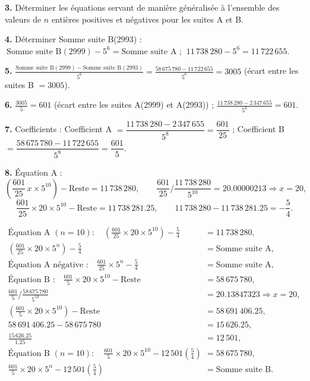 \documentclass[11pt,a4paper]{article}
\begin{document}
\textbf{3.} Déterminer les équations servant de manière généralisée à
l'ensemble des valeurs de $n$ entières positives et négatives pour les suites A
et B.

\textbf{4.} Déterminer Somme suite B(2993) :
$\ \text{Somme suite B}(2999) - 5^{6} = \text{Somme suite A}$ ;
$\ 11\,738\,280 - 5^{6} = 11\,722\,655$.

\textbf{5.} $\displaystyle \frac{\text{Somme suite B}(2999) - \text{Somme suite B}(2993)}{5^{6}}
= \frac{58\,675\,780 - 11\,722\,655}{5^{6}} = 3005$ \quad (écart entre les suites B $= 3005$).

\textbf{6.} $\displaystyle \frac{3005}{5} = 601$ (écart entre les suites A(2999) et A(2993)) ;
$\displaystyle \frac{11\,738\,280 - 2\,347\,655}{5^{6}} = 601$.

\textbf{7.} Coefficients : \quad
Coefficient A $= \dfrac{11\,738\,280 - 2\,347\,655}{5^{8}} = \dfrac{601}{25}$ ;\qquad
Coefficient B $= \dfrac{58\,675\,780 - 11\,722\,655}{5^{8}} = \dfrac{601}{5}$.

\textbf{8.} Équation A :
\[
\left(\frac{601}{25}\, x \times 5^{10}\right) - \text{Reste} = 11\,738\,280,
\qquad
\frac{601}{25}\Big/\frac{11\,738\,280}{5^{10}} = 20.00000213 \Rightarrow x = 20,
\]
\[
\frac{601}{25}\times 20 \times 5^{10} - \text{Reste} = 11\,738\,281.25,
\qquad
11\,738\,280 - 11\,738\,281.25 = -\frac{5}{4}.
\]

\begin{boiteformule}
\begin{align*}
\text{Équation A }(n=10):\quad
\left(\frac{601}{25}\times20\times5^{10}\right)-\frac{5}{4}
&=11\,738\,280,\\
\left(\frac{601}{25}\times20\times5^{n}\right)-\frac{5}{4}
&=\text{Somme suite A},\\
\text{Équation A négative :}\quad
\frac{601}{25}\times5^{n}-\frac{5}{4}
&=\text{Somme suite A},\\
\text{Équation B :}\quad
\frac{601}{5}\times20\times5^{10}-\text{Reste}
&=58\,675\,780,\\
\frac{601}{5}\Big/\frac{58\,675\,780}{5^{10}}
&=20.13847323\Rightarrow x=20,\\
\left(\frac{601}{5}\times20\times5^{10}\right)-\text{Reste}
&=58\,691\,406.25,\\
58\,691\,406.25-58\,675\,780 &=15\,626.25,\\
\frac{15\,626.25}{1.25} &=12\,501,\\
\text{Équation B }(n=10):\quad
\frac{601}{5}\times20\times5^{10}
-12\,501\left(\frac{5}{4}\right)
&=58\,675\,780,\\
\frac{601}{5}\times20\times5^{n}
-12\,501\left(\frac{5}{4}\right)
&=\text{Somme suite B}.
\end{align*}
\end{boiteformule}
\end{document}
